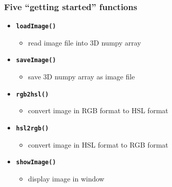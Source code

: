 \documentclass[english,14pt]{beamer}
\newcommand\blue[1]{{\color{blue} #1}}
\begin{document}
\begin{frame}[fragile]

\frametitle{Five ``getting started'' functions}

\begin{itemize}
	\item \textbf{\blue{\texttt{loadImage()}}}
	\begin{itemize}
		\item read image file into 3D numpy array
	\end{itemize}
		
	\item \textbf{\blue{\texttt{saveImage()}}}
	\begin{itemize}
		\item save 3D numpy array as image file
	\end{itemize}
			
	\item \textbf{\blue{\texttt{rgb2hsl()}}}
	\begin{itemize}
		\item convert image in RGB format to HSL format
	\end{itemize}
			
	\item \textbf{\blue{\texttt{hsl2rgb()}}}
	\begin{itemize}
		\item convert image in HSL format to RGB format
	\end{itemize}
			
	\item \textbf{\blue{\texttt{showImage()}}}
	\begin{itemize}
		\item display image in window
	\end{itemize}
\end{itemize}

\end{frame}

\end{document}
